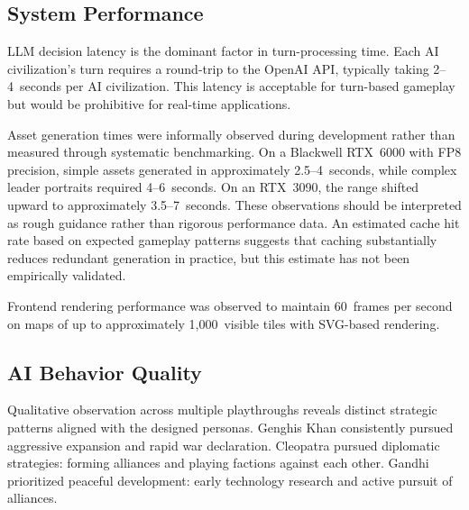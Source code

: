 \documentclass[conference]{IEEEtran}
\begin{document}
\subsection{System Performance}

LLM decision latency is the dominant factor in turn-processing time. Each
AI civilization's turn requires a round-trip to the OpenAI API, typically
taking 2--4~seconds per AI civilization. This latency is acceptable for
turn-based gameplay but would be prohibitive for real-time applications.

Asset generation times were informally observed during development rather
than measured through systematic benchmarking. On a Blackwell RTX~6000 with
FP8 precision, simple assets generated in approximately 2.5--4~seconds,
while complex leader portraits required 4--6~seconds. On an RTX~3090, the
range shifted upward to approximately 3.5--7~seconds. These observations
should be interpreted as rough guidance rather than rigorous performance
data. An estimated cache hit rate based on expected gameplay patterns
suggests that caching substantially reduces redundant generation in
practice, but this estimate has not been empirically validated.

Frontend rendering performance was observed to maintain 60~frames per second
on maps of up to approximately 1,000~visible tiles with SVG-based rendering.

\subsection{AI Behavior Quality}

Qualitative observation across multiple playthroughs reveals distinct
strategic patterns aligned with the designed personas. Genghis Khan
consistently pursued aggressive expansion and rapid war declaration.
Cleopatra pursued diplomatic strategies: forming alliances and playing
factions against each other. Gandhi prioritized peaceful development:
early technology research and active pursuit of alliances.
\end{document}
